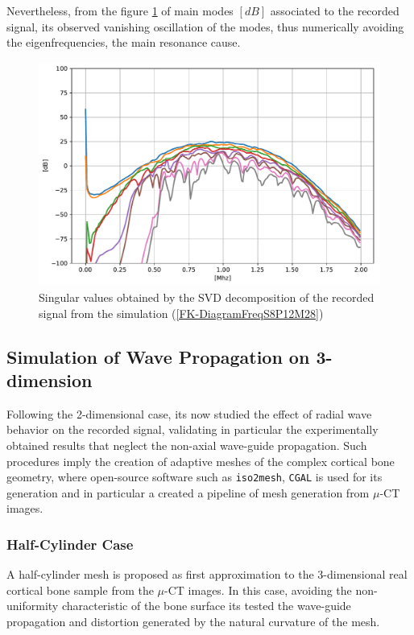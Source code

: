 Nevertheless, from the figure \ref{SVD-FreqS8P12M28} of main modes $[dB]$ associated to the recorded signal, its observed vanishing oscillation of the modes, thus numerically avoiding the eigenfrequencies, the main resonance cause.
\begin{figure}[!h]
	\centering
	\includegraphics[scale=.5]{images/FreqMultSous/2D-FreqSimP12W28eKV_SV.pdf}
	\caption{Singular values obtained by the SVD decomposition of the recorded signal from the simulation (\ref{FK-DiagramFreqS8P12M28})}
	\label{SVD-FreqS8P12M28}
\end{figure}


\subsection{Simulation of Wave Propagation on 3-dimension}
Following the 2-dimensional case, its now studied the effect of radial wave behavior on the recorded signal, validating in particular the experimentally obtained results that neglect the non-axial wave-guide propagation. 
Such procedures imply the creation of adaptive meshes of the complex cortical bone geometry, where open-source software such as \texttt{iso2mesh}, \texttt{CGAL} is used for its generation and in particular a created a pipeline of mesh generation from $\mu$-CT images.

\subsubsection{Half-Cylinder Case}
A half-cylinder mesh is proposed as first approximation to the 3-dimensional real cortical bone sample from the $\mu$-CT images. In this case, avoiding the non-uniformity characteristic of the bone surface its tested the wave-guide propagation and distortion generated by the natural curvature of the mesh.

